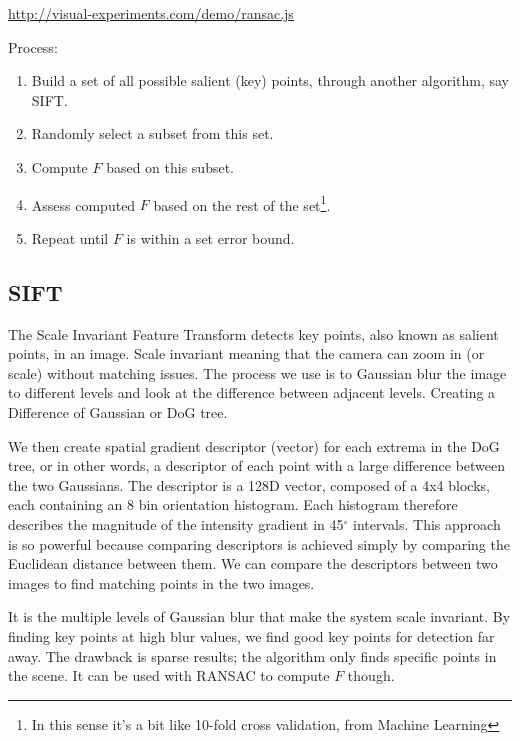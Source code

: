 \documentclass{article}
\begin{document}
        \url{http://visual-experiments.com/demo/ransac.js}
        
        Process: 
        \begin{enumerate}
            \item Build a set of all possible salient (key) points, through another algorithm, say SIFT.
            \item Randomly select a subset from this set.
            \item Compute $F$ based on this subset.
            \item Assess computed $F$ based on the rest of the set\footnote{In this sense it's a bit like 10-fold cross validation, from Machine Learning}.
            \item Repeat until $F$ is within a set error bound.
        \end{enumerate}

    \subsection{SIFT}
        The Scale Invariant Feature Transform detects key points, also known as salient points, in an image. Scale invariant meaning that the camera can zoom in (or scale) without matching issues. The process we use is to Gaussian blur the image to different levels and look at the difference between adjacent levels. Creating a Difference of Gaussian or DoG tree.

        We then create spatial gradient descriptor (vector) for each extrema in the DoG tree, or in other words, a descriptor of each point with a large difference between the two Gaussians. The descriptor is a 128D vector, composed of a 4x4 blocks, each containing an 8 bin orientation histogram. Each histogram therefore describes the magnitude of the intensity gradient in 45$^\circ$ intervals. This approach is so powerful because comparing descriptors is achieved simply by comparing the Euclidean distance between them. We can compare the descriptors between two images to find matching points in the two images.

        It is the multiple levels of Gaussian blur that make the system scale invariant. By finding key points at high blur values, we find good key points for detection far away. The drawback is sparse results; the algorithm only finds specific points in the scene. It can be used with RANSAC to compute $F$ though.
\end{document}
